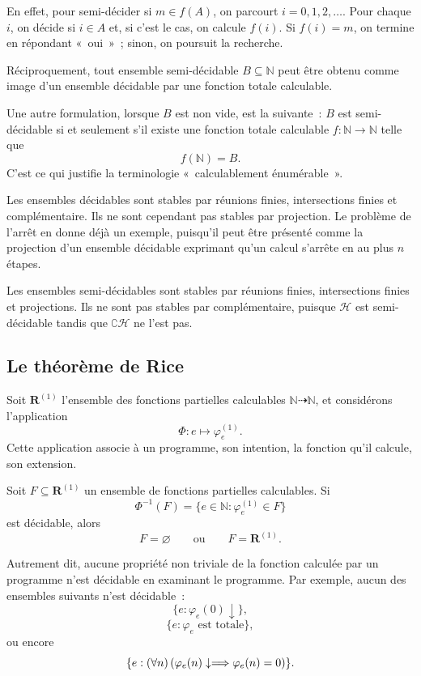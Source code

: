 En effet, pour semi-décider si $m\in f(A)$, on parcourt
$i=0,1,2,\ldots$.  Pour chaque $i$, on décide si $i\in A$ et, si c'est
le cas, on calcule $f(i)$.  Si $f(i)=m$, on termine en répondant
« oui » ; sinon, on poursuit la recherche.

Réciproquement, tout ensemble semi-décidable $B\subseteq\mathbb{N}$
peut être obtenu comme image d'un ensemble décidable par une fonction
totale calculable.

Une autre formulation, lorsque $B$ est non vide, est la suivante :
$B$ est semi-décidable si et seulement s'il existe une fonction totale
calculable $f\colon\mathbb{N}\to\mathbb{N}$ telle que
\[
f(\mathbb{N})=B.
\]
C'est ce qui justifie la terminologie « calculablement énumérable ».

\thingy Les ensembles décidables sont stables par réunions finies,
intersections finies et complémentaire.  Ils ne sont cependant pas
stables par projection.  Le problème de l'arrêt en donne déjà un
exemple, puisqu'il peut être présenté comme la projection d'un ensemble
décidable exprimant qu'un calcul s'arrête en au plus $n$ étapes.

Les ensembles semi-décidables sont stables par réunions finies,
intersections finies et projections.  Ils ne sont pas stables par
complémentaire, puisque $\mathscr{H}$ est semi-décidable tandis que
$\complement\mathscr{H}$ ne l'est pas.

\subsection{Le théorème de Rice}
\label{subsection-rice-theorem}

\thingy Soit $\mathbf{R}^{(1)}$ l'ensemble des fonctions partielles
calculables $\mathbb{N}\dasharrow\mathbb{N}$, et considérons
l'application
\[
\Phi\colon e\mapsto\varphi_e^{(1)}.
\]
Cette application associe à un programme, son intention, la fonction
qu'il calcule, son extension.

\begin{thm}[Rice]\label{rice-theorem}
Soit $F\subseteq\mathbf{R}^{(1)}$ un ensemble de fonctions partielles
calculables.  Si
\[
\Phi^{-1}(F)
 =\{e\in\mathbb{N}:\varphi_e^{(1)}\in F\}
\]
est décidable, alors
\[
F=\varnothing
\qquad\text{ou}\qquad
F=\mathbf{R}^{(1)}.
\]
\end{thm}

Autrement dit, aucune propriété non triviale de la fonction calculée
par un programme n'est décidable en examinant le programme.  Par
exemple, aucun des ensembles suivants n'est décidable :
\[
\{e:\varphi_e(0)\downarrow\},
\]
\[
\{e:\varphi_e\text{ est totale}\},
\]
ou encore
\[
\{e:(\forall n)\,
       (\varphi_e(n)\downarrow\Longrightarrow\varphi_e(n)=0)\}.
\]

